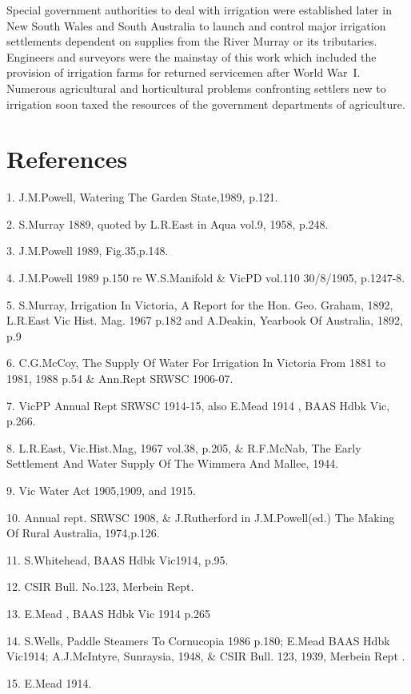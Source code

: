 Special government authorities to deal with irrigation were
established later in New South Wales and South Australia to launch and
control major irrigation settlements dependent on supplies from the
River Murray or its tributaries.  Engineers and surveyors were the
mainstay of this work which included the provision of irrigation farms
for returned servicemen after World War~I.  Numerous agricultural and
horticultural problems confronting settlers new to irrigation soon
taxed the resources of the government departments of agriculture.
		
\section{References}

1. J.M.Powell, Watering The Garden State,1989, p.121.

2. S.Murray 1889, quoted by L.R.East in Aqua vol.9, 1958, p.248.

3.  J.M.Powell 1989, Fig.35,p.148.

4.  J.M.Powell 1989 p.150 re W.S.Manifold \& VicPD vol.110
      30/8/1905, p.1247-8.

5.  S.Murray, Irrigation In Victoria, A Report for the Hon. Geo. Graham, 1892, 
      L.R.East Vic Hist. Mag. 1967 p.182 and A.Deakin, Yearbook Of Australia, 
      1892, p.9

6.  C.G.McCoy, The Supply Of Water For Irrigation In Victoria From 1881
       to 1981, 1988 p.54 \& Ann.Rept SRWSC 1906-07.

7.  VicPP Annual Rept SRWSC 1914-15, also  E.Mead 1914 , BAAS Hdbk
      Vic, p.266. 

8.  L.R.East, Vic.Hist.Mag, 1967 vol.38, p.205, \& R.F.McNab, 
     The Early Settlement And Water Supply Of The Wimmera And 
     Mallee, 1944.

9.  Vic Water Act 1905,1909, and 1915.

10.  Annual rept. SRWSC 1908, \& J.Rutherford in J.M.Powell(ed.) 
       The Making Of Rural Australia, 1974,p.126.

11. S.Whitehead, BAAS Hdbk Vic1914, p.95.

12. CSIR Bull. No.123, Merbein Rept.

13. E.Mead , BAAS Hdbk Vic 1914 p.265

14. S.Wells, Paddle Steamers To Cornucopia 1986 p.180; E.Mead BAAS 
      Hdbk Vic1914; A.J.McIntyre, Sunraysia, 1948, \& CSIR Bull. 123, 1939, 
      Merbein  Rept .

15. E.Mead 1914.

